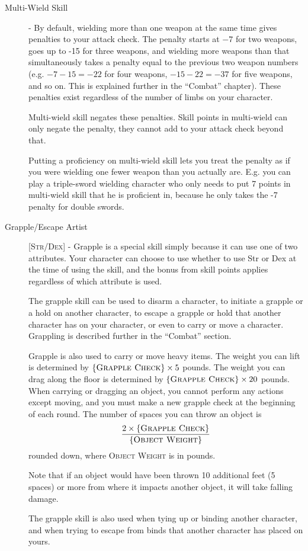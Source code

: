 \begin{description}
\item[Multi-Wield Skill] - By default, wielding more than one weapon at the same time gives penalties to your attack check. The penalty starts at $-7$ for two weapons, goes up to -15 for three weapons, and wielding more weapons than that simultaneously takes a penalty equal to the previous two weapon numbers (e.g. $-7-15 = -22$ for four weapons, $-15-22=-37$ for five weapons, and so on. This is explained further in the ``Combat'' chapter). These penalties exist regardless of the number of limbs on your character.

Multi-wield skill negates these penalties. Skill points in multi-wield can only negate the penalty, they cannot add to your attack check beyond that.

Putting a proficiency on multi-wield skill lets you treat the penalty as if you were wielding one fewer weapon than you actually are. E.g. you can play a triple-sword wielding character who only needs to put 7 points in multi-wield skill that he is proficient in, because he only takes the -7 penalty for double swords.

\item[Grapple/Escape Artist] [\textsc{Str}/\textsc{Dex}] - Grapple is a special skill simply because it can use one of two attributes. Your character can choose to use whether to use Str or Dex at the time of using the skill, and the bonus from skill points applies regardless of which attribute is used.

The grapple skill can be used to disarm a character, to initiate a grapple or a hold on another character, to escape a grapple or hold that another character has on your character, or even to carry or move a character. Grappling is described further in the ``Combat'' section.

Grapple is also used to carry or move heavy items. The weight you can lift is determined by $\{ \textsc{Grapple Check} \} \times 5$ pounds. The weight you can drag along the floor is determined by $\{ \textsc{Grapple Check} \} \times 20$ pounds. When carrying or dragging an object, you cannot perform any actions except moving, and you must make a new grapple check at the beginning of each round. The number of spaces you can throw an object is $$\frac{2\times \{ \textsc{Grapple Check} \}}{ \{ \textsc{Object Weight} \} }$$ rounded down, where \textsc{Object Weight} is in pounds.

Note that if an object would have been thrown 10 additional feet (5 spaces) or more from where it impacts another object, it will take falling damage.

The grapple skill is also used when tying up or binding another character, and when trying to escape from binds that another character has placed on yours.
\end{description}

